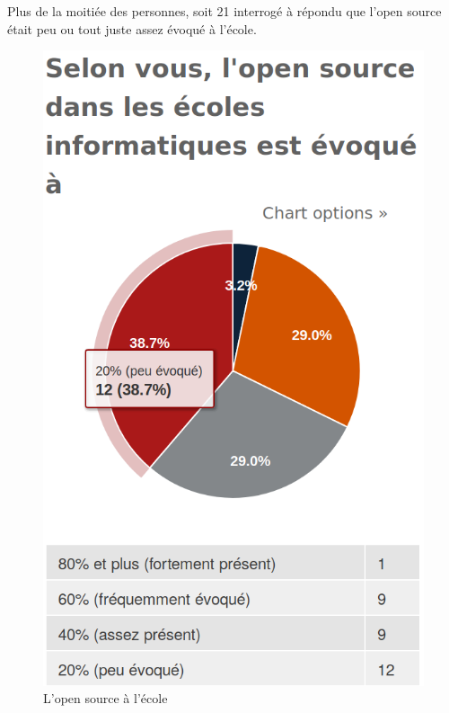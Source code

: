 			Plus de la moitiée des personnes, soit 21 interrogé à répondu que l'open source était peu ou tout juste assez évoqué à l'école.

			\begin{figure}[h]
				\center
				\includegraphics[scale=0.28]{./img/a5}
				\caption{L'open source à l'école}					
			\end{figure}

